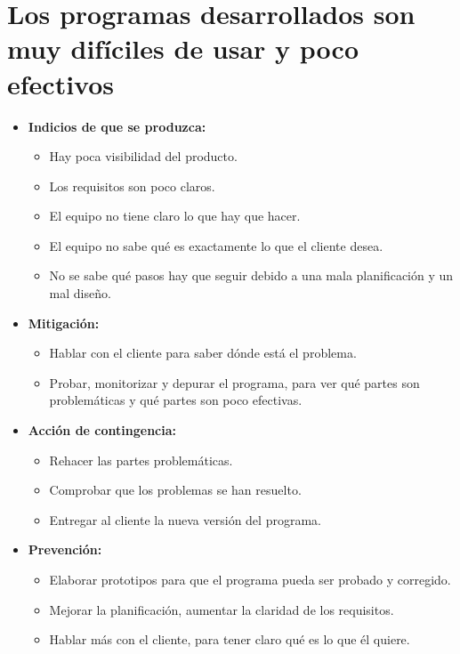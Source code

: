 \documentclass[spanish,a4paper,11pt, twoside]{report}	%
\begin{document}
	\section{Los programas desarrollados son muy difíciles de usar y poco efectivos}
		\begin{itemize}
			\item \textbf {Indicios de que se produzca: }
				\begin{itemize}
				  \item Hay poca visibilidad del producto.
				  \item Los requisitos son poco claros. 
				  \item El equipo no tiene claro lo que hay que hacer.
				  \item El equipo no sabe qué es exactamente lo que el cliente desea. 
				  \item No se sabe qué pasos hay que seguir debido a una mala planificación y un mal diseño.
				\end{itemize} 
			\item \textbf {Mitigación: }
				\begin{itemize}
				  \item Hablar con el cliente para saber dónde está el problema.
				  \item Probar, monitorizar y depurar el programa, para ver qué partes son problemáticas y qué partes son 
				  		poco efectivas.
				\end{itemize}
			\item \textbf {Acción de contingencia: }
				\begin{itemize}
				  \item Rehacer las partes problemáticas.
				  \item Comprobar que los problemas se han resuelto.
				  \item Entregar al cliente la nueva versión del programa. 
				\end{itemize} 
			\item \textbf {Prevención: }
				\begin{itemize}
				  \item Elaborar prototipos para que el programa pueda ser probado y corregido.
				  \item Mejorar la planificación, aumentar la claridad de los requisitos.
				  \item Hablar más con el cliente, para tener claro qué es lo que él quiere.
				\end{itemize}
			\end{itemize}
		
\end{document}
